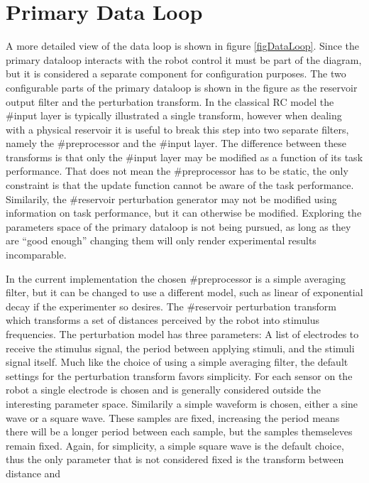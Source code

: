 \section{Primary Data Loop}
A more detailed view of the data loop is shown in figure \ref{figDataLoop}.
Since the primary dataloop interacts with the robot control it must be part of
the diagram, but it is considered a separate component for configuration
purposes.
The two configurable parts of the primary dataloop is shown in the figure as the
reservoir output filter and the perturbation transform.
In the classical RC model the #input layer is typically illustrated a single
transform, however when 
dealing with a physical reservoir it is useful to break this step into two
separate filters, namely the #preprocessor and the #input layer.
The difference between these transforms is that only the #input layer may be
modified as a function of its task performance.
That does not mean the #preprocessor has to be static, the only constraint is
that the update function cannot be aware of the task performance.
Similarily, the #reservoir perturbation generator may not be modified using
information on task performance, but it can otherwise be modified.
Exploring the parameters space of the primary dataloop is not being pursued, as
long as they are ``good enough'' changing them will only render experimental
results incomparable.
\par
In the current implementation the chosen #preprocessor is a simple averaging
filter, but it can be changed to use a different model, such as linear of
exponential decay if the experimenter so desires.
The #reservoir perturbation transform which transforms a
set of distances perceived by the robot into stimulus frequencies.
The perturbation model has three parameters: A list of electrodes to receive the
stimulus signal, the period between applying stimuli, and the stimuli signal
itself.
Much like the choice of using a simple averaging filter, the default settings
for the perturbation transform favors simplicity.
For each sensor on the robot a single electrode is chosen and is generally
considered outside the interesting parameter space.
Similarily a simple waveform is chosen, either a sine wave or a square wave.
These samples are fixed, increasing the period means there will be a longer
period between each sample, but the samples themseleves remain fixed.
Again, for simplicity, a simple square wave is the default choice, thus the only
parameter that is not considered fixed is the transform between distance and
